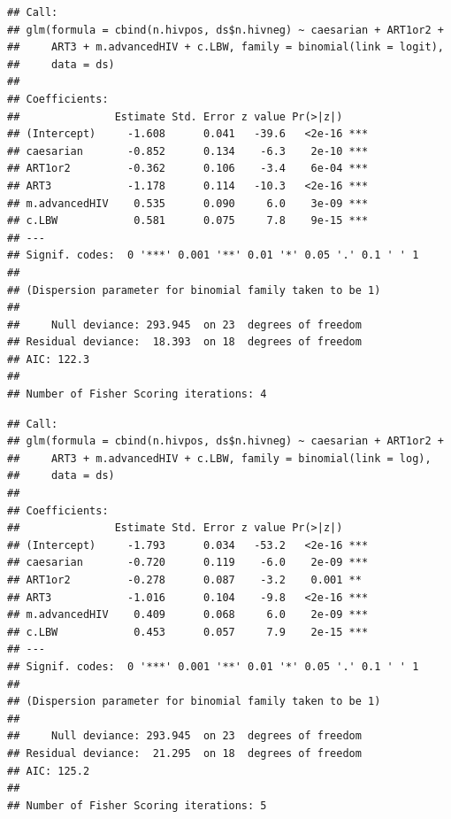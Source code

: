 \documentclass[landscape,twocolumn,letterpaper,9pt,reqno]{article}\usepackage[]{graphicx}\usepackage[]{color}
\newenvironment{knitrout}{}{} %
\begin{document}
\begin{knitrout}\small
{}\color{fgcolor}
\begin{verbatim}
## Call:
## glm(formula = cbind(n.hivpos, ds$n.hivneg) ~ caesarian + ART1or2 + 
##     ART3 + m.advancedHIV + c.LBW, family = binomial(link = logit), 
##     data = ds)
## 
## Coefficients:
##               Estimate Std. Error z value Pr(>|z|)    
## (Intercept)     -1.608      0.041   -39.6   <2e-16 ***
## caesarian       -0.852      0.134    -6.3    2e-10 ***
## ART1or2         -0.362      0.106    -3.4    6e-04 ***
## ART3            -1.178      0.114   -10.3   <2e-16 ***
## m.advancedHIV    0.535      0.090     6.0    3e-09 ***
## c.LBW            0.581      0.075     7.8    9e-15 ***
## ---
## Signif. codes:  0 '***' 0.001 '**' 0.01 '*' 0.05 '.' 0.1 ' ' 1
## 
## (Dispersion parameter for binomial family taken to be 1)
## 
##     Null deviance: 293.945  on 23  degrees of freedom
## Residual deviance:  18.393  on 18  degrees of freedom
## AIC: 122.3
## 
## Number of Fisher Scoring iterations: 4
\end{verbatim}

\end{knitrout}

\vspace{-0.22in}

\begin{knitrout}\small
{}\color{fgcolor}
\begin{verbatim}
## Call:
## glm(formula = cbind(n.hivpos, ds$n.hivneg) ~ caesarian + ART1or2 + 
##     ART3 + m.advancedHIV + c.LBW, family = binomial(link = log), 
##     data = ds)
## 
## Coefficients:
##               Estimate Std. Error z value Pr(>|z|)    
## (Intercept)     -1.793      0.034   -53.2   <2e-16 ***
## caesarian       -0.720      0.119    -6.0    2e-09 ***
## ART1or2         -0.278      0.087    -3.2    0.001 ** 
## ART3            -1.016      0.104    -9.8   <2e-16 ***
## m.advancedHIV    0.409      0.068     6.0    2e-09 ***
## c.LBW            0.453      0.057     7.9    2e-15 ***
## ---
## Signif. codes:  0 '***' 0.001 '**' 0.01 '*' 0.05 '.' 0.1 ' ' 1
## 
## (Dispersion parameter for binomial family taken to be 1)
## 
##     Null deviance: 293.945  on 23  degrees of freedom
## Residual deviance:  21.295  on 18  degrees of freedom
## AIC: 125.2
## 
## Number of Fisher Scoring iterations: 5
\end{verbatim}

\end{knitrout}
\end{document}
